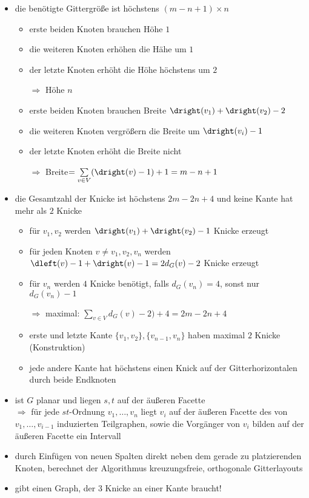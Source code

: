\begin{itemize}
	\item die benötigte Gittergröße ist höchstens $(m-n+1)\times n$
		\begin{itemize}
			\item erste beiden Knoten brauchen Höhe $1$
			\item die weiteren Knoten erhöhen die Hähe um $1$
			\item der letzte Knoten erhöht die Höhe höchstens um $2$
			\item[$\Rightarrow$] Höhe $n$
			\item erste beiden Knoten brauchen Breite $\dright(v_1)+\dright(v_2)-2$
			\item die weiteren Knoten vergrößern die Breite um $\dright(v_i)-1$
			\item der letzte Knoten erhöht die Breite nicht
			\item[$\Rightarrow$] Breite$=\sum\limits_{v\in V}(\dright(v)-1)+1=m-n+1$
		\end{itemize}
\end{itemize}
\topbreak
\vspace*{-2\baselineskip}
\begin{itemize}[itemsep=-1pt]
	\item die Gesamtzahl der Knicke ist höchstens $2m-2n+4$ und keine Kante hat mehr als $2$ Knicke
		\begin{itemize}[itemsep=-1pt]
			\item für $v_1,v_2$ werden $\dright(v_1)+\dright(v_2)-1$ Knicke erzeugt
			\item für jeden Knoten $v\neq v_1,v_2,v_n$ werden $\dleft(v)-1+\dright(v) -1 =2d_G(v)-2$ Knicke erzeugt
			\item für $v_n$ werden $4$ Knicke benötigt, falls $d_G(v_n)=4$, sonst nur $d_G(v_n)-1$
			\item[$\Rightarrow$] maximal: $\sum\limits_{v\in V}d_G(v)-2)+4=2m-2n+4$
			\item erste und letzte Kante $\{v_1,v_2\}, \{v_{n-1},v_n\}$ haben maximal $2$ Knicke (Konstruktion)
			\item jede andere Kante hat höchstens einen Knick auf der Gitterhorizontalen durch beide Endknoten
		\end{itemize}
	\item ist $G$ planar und liegen $s,t$ auf der äußeren Facette\\
	$\Rightarrow$ für jede $st$-Ordnung $v_1,\dots,v_n$ liegt $v_i$ auf der äußeren Facette des von $v_1,\dots,v_{i-1}$ induzierten Teilgraphen, sowie die Vorgänger von $v_i$ bilden auf der äußeren Facette ein Intervall
	\item durch Einfügen von neuen Spalten direkt neben dem gerade zu platzierenden Knoten, berechnet der Algorithmus kreuzungsfreie, orthogonale Gitterlayouts
	\item gibt einen Graph, der $3$ Knicke an einer Kante braucht!
\end{itemize}
